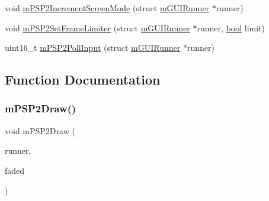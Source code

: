 \begin{DoxyCompactItemize}
\item 
void \mbox{\hyperlink{psp2-context_8h_a88df7b81ae33955caa66f8f0516c8a2a}{m\+P\+S\+P2\+Increment\+Screen\+Mode}} (struct \mbox{\hyperlink{structm_g_u_i_runner}{m\+G\+U\+I\+Runner}} $\ast$runner)
\item 
void \mbox{\hyperlink{psp2-context_8h_a9a298ef5f14d11b2cf482a19a3a55d82}{m\+P\+S\+P2\+Set\+Frame\+Limiter}} (struct \mbox{\hyperlink{structm_g_u_i_runner}{m\+G\+U\+I\+Runner}} $\ast$runner, \mbox{\hyperlink{libretro_8h_a4a26dcae73fb7e1528214a068aca317e}{bool}} limit)
\item 
uint16\+\_\+t \mbox{\hyperlink{psp2-context_8h_a29b280976db23268da118020f60ce728}{m\+P\+S\+P2\+Poll\+Input}} (struct \mbox{\hyperlink{structm_g_u_i_runner}{m\+G\+U\+I\+Runner}} $\ast$runner)
\end{DoxyCompactItemize}


\subsection{Function Documentation}
\mbox{\label{psp2-context_8h_ac47f4c33aec2cd84a2236b2686d1ffbe}} 
\subsubsection{\texorpdfstring{m\+P\+S\+P2\+Draw()}{mPSP2Draw()}}
{\footnotesize\ttfamily void m\+P\+S\+P2\+Draw (\begin{DoxyParamCaption}\item[{struct \mbox{\hyperlink{structm_g_u_i_runner}{m\+G\+U\+I\+Runner}} $\ast$}]{runner,  }\item[{\mbox{\hyperlink{libretro_8h_a4a26dcae73fb7e1528214a068aca317e}{bool}}}]{faded }\end{DoxyParamCaption})}

